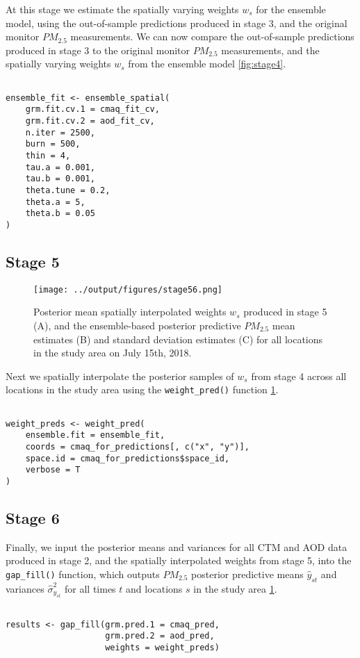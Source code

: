 At this stage we estimate the spatially varying weights $w_s$ for the ensemble model, using the out-of-sample predictions produced in stage 3, and the original monitor $PM_{2.5}$ measurements.
We can now compare the out-of-sample predictions produced in stage 3 to the original monitor $PM_{2.5}$ measurements, and the spatially varying weights $w_s$ from the ensemble model \ref{fig:stage4}.

\begin{lstlisting}

ensemble_fit <- ensemble_spatial(
    grm.fit.cv.1 = cmaq_fit_cv,
    grm.fit.cv.2 = aod_fit_cv,
    n.iter = 2500,
    burn = 500,
    thin = 4,
    tau.a = 0.001,
    tau.b = 0.001,
    theta.tune = 0.2,
    theta.a = 5,
    theta.b = 0.05
)

\end{lstlisting}


\subsection*{Stage 5}


\begin{figure}[ht]
    \centering
    \texttt{[image: ../output/figures/stage56.png]}
    \caption{Posterior mean spatially interpolated weights $w_s$ produced in stage 5 (A), and the ensemble-based posterior predictive $PM_{2.5}$ mean estimates (B) and standard deviation estimates (C) for all locations in the study area on July 15th, 2018.}
    \label{fig:stage56}
\end{figure}

Next we spatially interpolate the posterior samples of $w_s$ from stage 4 across all locations in the study area using the \texttt{weight\_pred()} function \ref{fig:stage56}.

\begin{lstlisting}

weight_preds <- weight_pred(
    ensemble.fit = ensemble_fit,
    coords = cmaq_for_predictions[, c("x", "y")],
    space.id = cmaq_for_predictions$space_id,
    verbose = T
)

\end{lstlisting}

\subsection*{Stage 6}

Finally, we input the posterior means and variances for all CTM and AOD data produced in stage 2, and the spatially interpolated weights from stage 5, into the \texttt{gap\_fill()} function, which outputs $PM_{2.5}$ posterior predictive means $\hat{y}_{st}$ and variances $\hat{\sigma}^{2}_{y_{st}}$ for all times $t$ and locations $s$ in the study area \ref{fig:stage56}.



\begin{lstlisting}

results <- gap_fill(grm.pred.1 = cmaq_pred,
                    grm.pred.2 = aod_pred,
                    weights = weight_preds)

\end{lstlisting}

